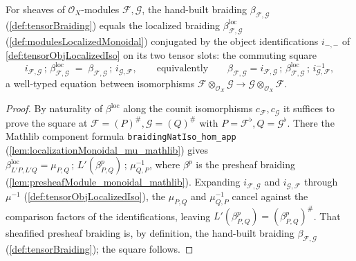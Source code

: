 \begin{lemma}
  \label{lem:tensorBraiding_eq_localizedBraiding}
  For sheaves of \(\mathcal{O}_X\)-modules \(\mathcal{F}, \mathcal{G}\), the
  hand-built braiding \(\beta_{\mathcal{F},\mathcal{G}}\)
  (\cref{def:tensorBraiding}) equals the localized braiding
  \(\beta^{\mathrm{loc}}_{\mathcal{F},\mathcal{G}}\)
  (\cref{def:modulesLocalizedMonoidal}) conjugated by the object identifications
  \(i_{-,-}\) of \cref{def:tensorObjLocalizedIso} on its two tensor slots: the
  commuting square
  \[
    i_{\mathcal{F},\mathcal{G}} \,;\,
      \beta^{\mathrm{loc}}_{\mathcal{F},\mathcal{G}}
      \;=\;
      \beta_{\mathcal{F},\mathcal{G}} \,;\, i_{\mathcal{G},\mathcal{F}},
    \qquad\text{equivalently}\qquad
    \beta_{\mathcal{F},\mathcal{G}}
      = i_{\mathcal{F},\mathcal{G}} \,;\,
        \beta^{\mathrm{loc}}_{\mathcal{F},\mathcal{G}} \,;\,
        i_{\mathcal{G},\mathcal{F}}^{-1},
  \]
  a well-typed equation between isomorphisms
  \(\mathcal{F} \otimes_{\mathcal{O}_X} \mathcal{G} \to
  \mathcal{G} \otimes_{\mathcal{O}_X} \mathcal{F}\).
\end{lemma}

\begin{proof}
  By naturality of \(\beta^{\mathrm{loc}}\) along the counit isomorphisms
  \(c_{\mathcal{F}}, c_{\mathcal{G}}\) it suffices to prove the square at
  \(\mathcal{F} = (P)^{\#}, \mathcal{G} = (Q)^{\#}\) with \(P =
  \mathcal{F}^{\flat}, Q = \mathcal{G}^{\flat}\). There the Mathlib component
  formula \texttt{braidingNatIso\_hom\_app}
  (\cref{lem:localizationMonoidal_mu_mathlib}) gives
  \(\beta^{\mathrm{loc}}_{L'P, L'Q} = \mu_{P,Q}\,;\, L'(\beta^p_{P,Q})\,;\,
  \mu_{Q,P}^{-1}\), where \(\beta^p\) is the presheaf braiding
  (\cref{lem:presheafModule_monoidal_mathlib}). Expanding
  \(i_{\mathcal{F},\mathcal{G}}\) and \(i_{\mathcal{G},\mathcal{F}}\) through
  \(\mu^{-1}\) (\cref{def:tensorObjLocalizedIso}), the \(\mu_{P,Q}\) and
  \(\mu_{Q,P}^{-1}\) cancel against the comparison factors of the identifications,
  leaving \(L'(\beta^p_{P,Q}) = (\beta^p_{P,Q})^{\#}\). That sheafified presheaf
  braiding is, by definition, the hand-built braiding
  \(\beta_{\mathcal{F},\mathcal{G}}\) (\cref{def:tensorBraiding}); the square
  follows.
\end{proof}

